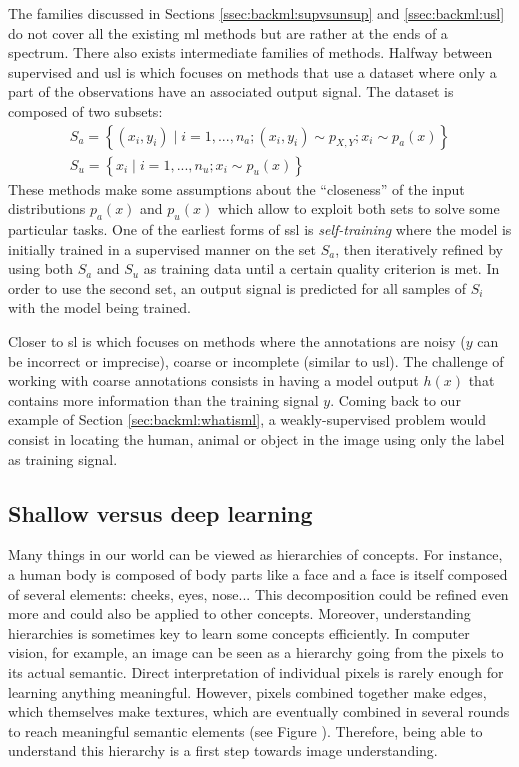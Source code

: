 The families discussed in Sections \ref{ssec:backml:supvsunsup} and \ref{ssec:backml:usl} do not cover all the existing \acrlong{ml} methods but are rather at the ends of a spectrum. There also exists intermediate families of methods. Halfway between supervised and \acrlong{usl} is  which focuses on methods that use a dataset where only a part of the observations have an associated output signal. The dataset is composed of two subsets:
\begin{eqnarray}
S_a = \left\{(x_i, y_i) \mid i = 1,...,n_a; (x_i, y_i) \sim p_{X,Y}; x_i \sim p_a(x)\right\} \\
S_u = \left\{x_i \mid i = 1,...,n_u; x_i \sim p_u(x)\right\}
\end{eqnarray}
These  methods make some assumptions about the ``closeness'' of the input distributions $p_a(x)$ and $p_u(x)$ \parencite{chapelle2006semi} which allow to exploit both sets to solve some particular tasks. One of the earliest forms of \acrlong{ssl} is \textit{self-training} where the model is initially trained in a supervised manner on the set $S_a$, then iteratively refined by using both $S_a$ and $S_u$ as training data until a certain quality criterion is met. In order to use the second set, an output signal is predicted for all samples of $S_i$ with the model being trained. 

Closer to \acrlong{sl} is  which focuses on methods where the annotations are noisy (\eg $y$ can be incorrect or imprecise), coarse or incomplete (similar to \acrlong{usl}). The challenge of working with coarse annotations consists in having a model output $h(x)$ that contains more information than the training signal $y$. Coming back to our example of Section \ref{sec:backml:whatisml}, a weakly-supervised problem would consist in locating the human, animal or object in the image using only the label as training signal.


\subsection{Shallow versus deep learning}

Many things in our world can be viewed as hierarchies of concepts. For instance, a human body is composed of body parts like a face and a face is itself composed of several elements: cheeks, eyes, nose... This decomposition could be refined even more and could also be applied to other concepts. Moreover, understanding hierarchies is sometimes key to learn some concepts efficiently. In computer vision, for example, an image can be seen as a hierarchy going from the pixels to its actual semantic. Direct interpretation of individual pixels is rarely enough for learning anything meaningful. However, pixels combined together make edges, which themselves make textures, which are eventually combined in several rounds to reach meaningful semantic elements (see Figure ). Therefore, being able to understand this hierarchy is a first step towards image understanding.   

